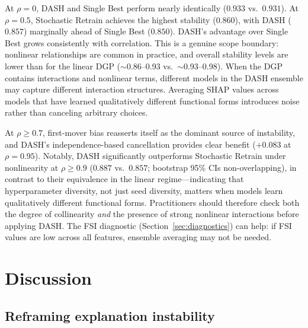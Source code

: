 \documentclass[10pt]{article}
\newcommand{\dash}{\textsc{DASH}}
\newcommand{\rhovar}{\rho}
\begin{document}
At $\rhovar = 0$, \dash{} and Single Best perform nearly identically
($0.933$ vs.\ $0.931$). At $\rhovar = 0.5$, Stochastic Retrain achieves
the highest stability ($0.860$), with \dash{} ($0.857$) marginally ahead
of Single Best ($0.850$). \dash{}'s advantage over Single Best grows
consistently with correlation. This is a genuine scope boundary: nonlinear relationships
are common in practice, and overall stability levels are lower than for
the linear DGP ($\sim$0.86--0.93 vs.\ $\sim$0.93--0.98). When the DGP
contains interactions and nonlinear terms, different models in the DASH
ensemble may capture different interaction structures. Averaging SHAP
values across models that have learned qualitatively different functional
forms introduces noise rather than canceling arbitrary choices.

At $\rhovar \geq 0.7$, first-mover bias reasserts itself as the dominant
source of instability, and \dash{}'s independence-based cancellation
provides clear benefit ($+0.083$ at $\rhovar = 0.95$).
Notably, \dash{} significantly outperforms Stochastic Retrain under
nonlinearity at $\rhovar \geq 0.9$ ($0.887$ vs.\ $0.857$; bootstrap
95\% CIs non-overlapping), in contrast to their equivalence in the
linear regime---indicating that hyperparameter diversity, not just seed
diversity, matters when models learn qualitatively different functional
forms.
Practitioners should therefore check both the degree of collinearity
\emph{and} the presence of strong nonlinear interactions before applying
\dash{}. The FSI diagnostic (Section~\ref{sec:diagnostics}) can help:
if FSI values are low across all features, ensemble averaging may not be
needed.


\section{Discussion}
\label{sec:discussion}

\subsection{Reframing explanation instability}
\end{document}
